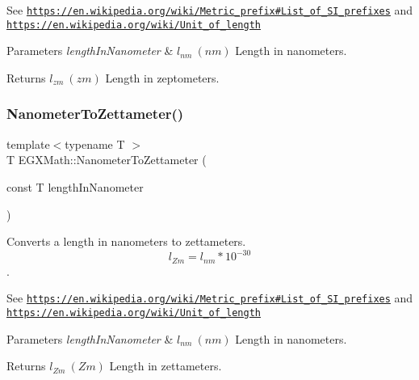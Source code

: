 See \href{https://en.wikipedia.org/wiki/Metric_prefix#List_of_SI_prefixes}{\tt https\+://en.\+wikipedia.\+org/wiki/\+Metric\+\_\+prefix\#\+List\+\_\+of\+\_\+\+S\+I\+\_\+prefixes} and \href{https://en.wikipedia.org/wiki/Unit_of_length}{\tt https\+://en.\+wikipedia.\+org/wiki/\+Unit\+\_\+of\+\_\+length} 
\begin{DoxyParams}{Parameters}
{\em length\+In\+Nanometer} & $ l_{nm}\ (nm)$ Length in nanometers. \\
\hline
\end{DoxyParams}
\begin{DoxyReturn}{Returns}
$ l_{zm}\ (zm)$ Length in zeptometers. 
\end{DoxyReturn}
\mbox{\label{group___e_g_x_math-_conversions-_length_conversions-_nanometer-_s_i_ga3306731dd581f22ad9203923e4a03d2a}} 
\subsubsection{\texorpdfstring{Nanometer\+To\+Zettameter()}{NanometerToZettameter()}}
{\footnotesize\ttfamily template$<$typename T $>$ \\
T E\+G\+X\+Math\+::\+Nanometer\+To\+Zettameter (\begin{DoxyParamCaption}\item[{const T}]{length\+In\+Nanometer }\end{DoxyParamCaption})}



Converts a length in nanometers to zettameters. \[ l_{Zm}=l_{nm} * 10^{-30} \]. 

See \href{https://en.wikipedia.org/wiki/Metric_prefix#List_of_SI_prefixes}{\tt https\+://en.\+wikipedia.\+org/wiki/\+Metric\+\_\+prefix\#\+List\+\_\+of\+\_\+\+S\+I\+\_\+prefixes} and \href{https://en.wikipedia.org/wiki/Unit_of_length}{\tt https\+://en.\+wikipedia.\+org/wiki/\+Unit\+\_\+of\+\_\+length} 
\begin{DoxyParams}{Parameters}
{\em length\+In\+Nanometer} & $ l_{nm}\ (nm)$ Length in nanometers. \\
\hline
\end{DoxyParams}
\begin{DoxyReturn}{Returns}
$ l_{Zm}\ (Zm)$ Length in zettameters. 
\end{DoxyReturn}
